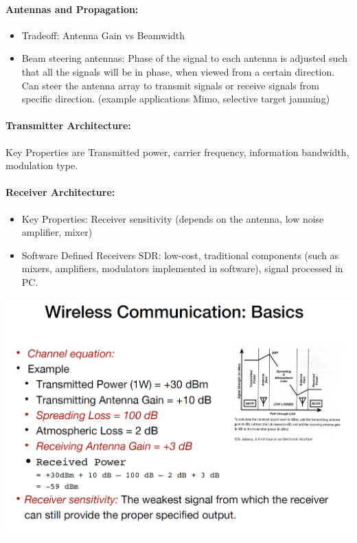 \paragraph{Antennas and Propagation:}
\begin{itemize}
    \item Tradeoff: Antenna Gain vs Beamwidth
    \item Beam steering antennas: Phase of the signal to each antenna is adjusted such that all the signals will be in phase, when viewed from a certain direction. Can steer the antenna array to transmit signals or receive signals from specific direction. (example applications Mimo, selective target jamming)
\end{itemize}

\paragraph{Transmitter Architecture: }
Key Properties are Transmitted power, carrier frequency, information bandwidth, modulation type.

\paragraph{Receiver Architecture: }
\begin{itemize}
    \item Key Properties: Receiver sensitivity (depends on the antenna, low noise amplifier, mixer)
    \item Software Defined Receivers SDR: low-cost, traditional components (such as mixers, amplifiers, modulators implemented in software), signal processed in PC.
\end{itemize}

\begin{minipage}{\linewidth}
    \centering      
    \includegraphics[width=\linewidth]{Figures/L1_channel_equation.PNG}
\end{minipage}

